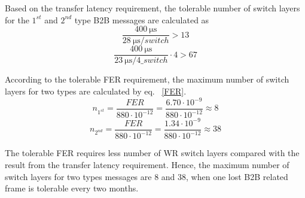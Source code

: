 Based on the transfer latency requirement, the tolerable number of switch layers for the $1^\mathit{st}$ and $2^\mathit{nd}$ type B2B messages are calculated as
\begin{equation}
		\frac{\SI{400}{\us}}{\SI{28}{\us/switch}}>13
\end{equation}
\begin{equation}
		\frac{\SI{400}{\us}}{\SI{23}{\us/4\_switch}}\cdot 4 > 67
\end{equation}

According to the tolerable FER requirement, the maximum number of switch layers for two types are calculated by eq. ~\ref{FER}.  
\begin{equation}
n_{1^{st}}=\frac{FER}{880\cdot10^{-12}}=\frac{6.70\cdot 10^{-9}}{880\cdot10^{-12}}\approx 8
\end{equation}
\begin{equation}
n_{2^{nd}}=\frac{FER}{880\cdot10^{-12}}=\frac{1.34\cdot 10^{-9}}{880\cdot10^{-12}}\approx 38
\end{equation}

The tolerable FER requires less number of WR switch layers compared with the result from the transfer latency requirement. Hence, the maximum number of switch layers for two types messages are 8 and 38, when one lost B2B related frame is tolerable every two months. 

